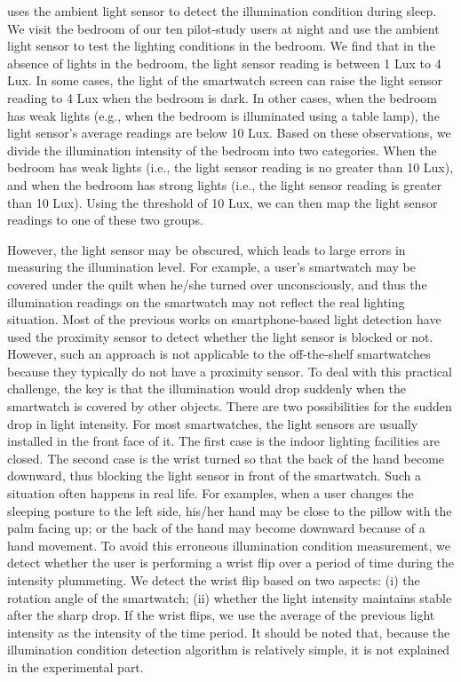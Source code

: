 {\systemname} uses the ambient light sensor to detect the illumination condition during sleep. We visit the bedroom of our ten pilot-study
users at night and use the ambient light sensor to test the lighting conditions in the bedroom. We find that in the absence of lights in
the bedroom, the light sensor reading is between 1 Lux to 4 Lux. In some cases, the light of the smartwatch screen can raise the light
sensor reading to 4 Lux when the bedroom is dark. In other cases, when the bedroom has weak lights (e.g., when the bedroom is illuminated
using a table lamp), the light sensor's average readings are below 10 Lux. Based on these observations, we divide the illumination
intensity of the bedroom into two categories. When the bedroom has weak lights (i.e., the light sensor reading is no greater than 10 Lux),
and when the bedroom has strong lights (i.e., the light sensor reading is greater than 10 Lux). Using the threshold of 10 Lux, we can then
map the light sensor readings to one of these two groups.


However, the light sensor may be obscured, which leads to large errors in measuring the illumination level. For example, a user's smartwatch may be covered under the quilt when he/she turned over unconsciously, and thus the illumination readings on the smartwatch may not reflect the real lighting situation. Most of the previous works on smartphone-based light detection have used the proximity sensor to detect whether the light sensor is blocked or not. However, such an approach is not applicable to the off-the-shelf smartwatches because they typically do not have a proximity sensor.  To deal with this practical challenge, the key is that the illumination would drop suddenly when the smartwatch is covered by other objects. There are two possibilities for the sudden drop in light intensity. For most smartwatches, the light sensors are usually installed in the front face of it. The first case is the indoor lighting facilities are closed. The second case is the wrist turned so that the back of the hand become downward, thus blocking the light sensor in front of the smartwatch. Such a situation often happens in real life. For examples, when a user changes the sleeping posture to the left side, his/her hand may be close to the pillow with the palm facing up; or the back of the hand may become downward because of a hand movement. To avoid this erroneous illumination condition measurement, we detect whether the user is performing a wrist flip over a period of time during the intensity plummeting. We detect the wrist flip based on two aspects: (i) the rotation angle of the smartwatch; (ii) whether the light intensity maintains stable after the sharp drop. If the wrist flips, we use the average of the previous light intensity as the intensity of the time period. It should be noted that, because the illumination condition detection algorithm is relatively simple, it is not explained in the experimental part.

